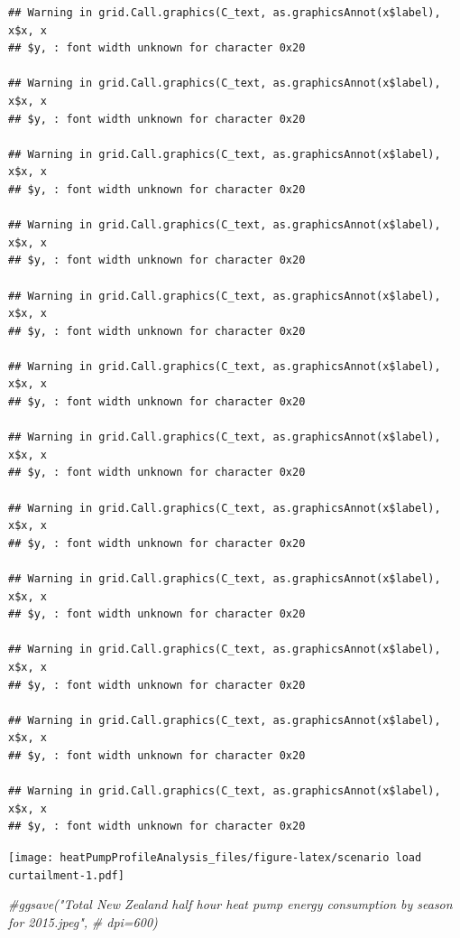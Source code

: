 \documentclass[]{article}
\newenvironment{Shaded}{\begin{snugshade}}{\end{snugshade}}
\newcommand{\CommentTok}[1]{\textcolor[rgb]{0.56,0.35,0.01}{\textit{#1}}}
\theoremstyle{definition}
\theoremstyle{definition}
\theoremstyle{definition}
\theoremstyle{remark}
\begin{document}
\begin{verbatim}
## Warning in grid.Call.graphics(C_text, as.graphicsAnnot(x$label), x$x, x
## $y, : font width unknown for character 0x20

## Warning in grid.Call.graphics(C_text, as.graphicsAnnot(x$label), x$x, x
## $y, : font width unknown for character 0x20

## Warning in grid.Call.graphics(C_text, as.graphicsAnnot(x$label), x$x, x
## $y, : font width unknown for character 0x20

## Warning in grid.Call.graphics(C_text, as.graphicsAnnot(x$label), x$x, x
## $y, : font width unknown for character 0x20

## Warning in grid.Call.graphics(C_text, as.graphicsAnnot(x$label), x$x, x
## $y, : font width unknown for character 0x20

## Warning in grid.Call.graphics(C_text, as.graphicsAnnot(x$label), x$x, x
## $y, : font width unknown for character 0x20

## Warning in grid.Call.graphics(C_text, as.graphicsAnnot(x$label), x$x, x
## $y, : font width unknown for character 0x20

## Warning in grid.Call.graphics(C_text, as.graphicsAnnot(x$label), x$x, x
## $y, : font width unknown for character 0x20

## Warning in grid.Call.graphics(C_text, as.graphicsAnnot(x$label), x$x, x
## $y, : font width unknown for character 0x20

## Warning in grid.Call.graphics(C_text, as.graphicsAnnot(x$label), x$x, x
## $y, : font width unknown for character 0x20

## Warning in grid.Call.graphics(C_text, as.graphicsAnnot(x$label), x$x, x
## $y, : font width unknown for character 0x20

## Warning in grid.Call.graphics(C_text, as.graphicsAnnot(x$label), x$x, x
## $y, : font width unknown for character 0x20
\end{verbatim}

\texttt{[image: heatPumpProfileAnalysis\_files/figure-latex/scenario load curtailment-1.pdf]}

\begin{Shaded}
\begin{Highlighting}[]
\CommentTok{#ggsave("Total New Zealand half hour heat pump energy consumption by season for 2015.jpeg",}
      \CommentTok{# dpi=600)}
\end{Highlighting}
\end{Shaded}
\end{document}
